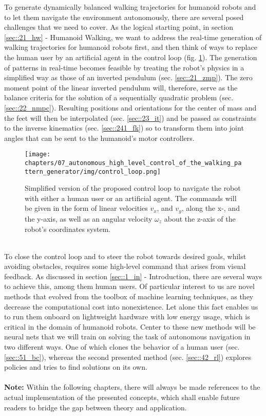 \label{sec::7_ah}
To generate dynamically balanced walking trajectories for humanoid robots and to let them navigate the environment autonomously, there are several posed challenges that we need to cover. As the logical starting point, in section \ref{sec::21_hw} - Humanoid Walking, we want to address the real-time generation of walking trajectories for humanoid robots first, and then think of ways to replace the human user by an artificial agent in the control loop (fig. \ref{fig::2_cl}). The generation of patterns in real-time becomes feasible by treating the robot's physics in a simplified way as those of an inverted pendulum (sec. \ref{sec::21_zmp}). The zero moment point of the linear inverted pendulum will, therefore, serve as the balance criteria for the solution of a sequentially quadratic problem (sec. \ref{sec::22_nmpc}).  Resulting positions and orientations for the center of mass and the feet will then be interpolated (sec. \ref{sec::23_it}) and be passed as constraints to the inverse kinematics (sec. \ref{sec::241_fk}) so to transform them into joint angles that can be sent to the humanoid's motor controllers.
\begin{figure}[h!]
	\centering
	\texttt{[image: chapters/07\_autonomous\_high\_level\_control\_of\_the\_walking\_pattern\_generator/img/control\_loop.png]}
	\caption{Simplified version of the proposed control loop to navigate the robot with either a human user or an artificial agent. The commands will be given in the form of linear velocities $v_x$, and $v_y$, along the x-, and the y-axis, as well as an angular velocity $\omega_z$ about the z-axis of the robot's coordinates system.}
	\label{fig::2_cl}
\end{figure}
\\
To close the control loop and to steer the robot towards desired goals, whilst avoiding obstacles, requires some high-level command that arises from visual feedback. As discussed in section \ref{sec::1_in} - Introduction, there are several ways to achieve this, among them human users. Of particular interest to us are novel methods that evolved from the toolbox of machine learning techniques, as they decrease the computational cost into nonexistence. Let alone this fact enables us to run them onboard on lightweight hardware with low energy usage, which is critical in the domain of humanoid robots. Center to these new methods will be neural nets that we will train on solving the task of autonomous navigation in two different ways. One of which clones the behavior of a human user (sec. \ref{sec::51_bc}), whereas the second presented method (sec. \ref{sec::42_rl}) explores policies and tries to find solutions on its own.
\\\\
\textbf{Note:} Within the following chapters, there will always be made references to the actual implementation of the presented concepts, which shall enable future readers to bridge the gap between theory and application.